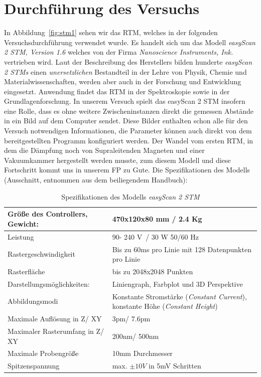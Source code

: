 \section{Durchführung des Versuchs}
In Abbildung~\ref{fig:stm1} sehen wir das RTM, welches in der
folgenden Versuchsdurchführung verwendet wurde. Es handelt sich
um das Modell \textit{easyScan 2 STM, Version 1.6} welches von 
der Firma \textit{Nanoscience Instruments, Ink.} vertrieben wird.
Laut der Beschreibung des Herstellers 
bilden hunderte \textit{easyScan 2 STMs} einen
\textit{unersetzlichen} Bestandteil in der Lehre von Physik,
Chemie und Materialwissenschaften, werden aber auch in der
Forschung und Entwicklung eingesetzt. Anwendung findet das RTM
in der Spektroskopie sowie in der Grundlagenforschung.
In unserem Versuch spielt das easyScan 2 STM insofern eine Rolle,
dass es ohne weitere Zwischeninstanzen direkt die gemessen
Abstände in ein Bild auf dem Computer sendet. Diese Bilder
enthalten schon alle für den Versuch notwendigen Informationen,
die Parameter können auch direkt von dem bereitgestellten Programm
konfiguriert werden. Der Wandel vom ersten RTM, in dem die Dämpfung
noch von Supraleitenden Magneten und einer Vakuumkammer hergestellt
werden musste, zum diesem Modell und diese Fortschritt kommt uns
in unserem FP zu Gute. Die Spezifikationen des Modells 
(Ausschnitt, entnommen aus dem beiliegendem Handbuch):\\
\begin{table}[h]
\begin{tabular}{| l | p{7cm} |}
\hline
  Größe des Controllers, Gewicht: & 470x120x80 mm / 2.4 Kg\\ \hline
  Leistung & 90- 240 V~/ 30 W 50/60 Hz \\ \hline
  Rastergeschwindigkeit & Bis zu 60ms pro Linie mit 128 Datenpunkten  pro Linie \\ \hline
Rasterfläche & bis zu 2048x2048 Punkten \\ \hline 
Darstellungsmöglichkeiten: & Liniengraph, Farbplot und 3D Perspektive \\ \hline
Abbildungsmodi & Konstante Stromstärke (\textit{Constant Current}),
konstante Höhe (\textit{Constant Height}) \\ \hline
Maximale Auflösung in Z/ XY & 3pm/ 7.6pm \\ \hline
Maximaler Rasterumfang in Z/ XY & 200nm/ 500nm  \\ \hline
Maximale Probengröße & 10mm Durchmesser \\ \hline
Spitzenspannung & max. $\pm 10V$ in 5mV Schritten \\ \hline
\end{tabular}
\caption{Spezifikationen des Modells \textit{easyScan 2 STM}}
\label{tab:STM}
\end{table}

